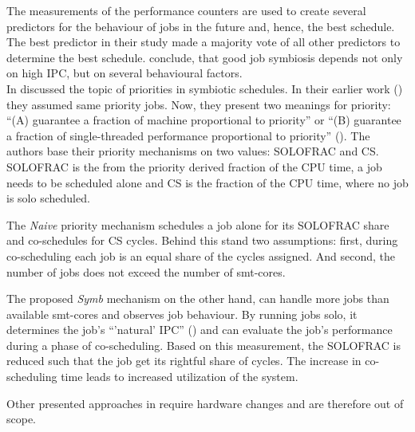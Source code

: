 The measurements of the performance counters are used to create several
predictors for the behaviour of jobs in the future and, hence, the best schedule.
The best predictor in their study made a majority vote of all other predictors
to determine the best schedule.
\citeauthor{snavely_symbiotic_2000} conclude, that good job symbiosis depends
not only on high IPC, but on several behavioural factors.
\\


In \citeyear{snavely_symbiotic_2002} \citeauthor{snavely_symbiotic_2002}
discussed the topic of priorities in symbiotic schedules.
In their earlier work (\cite{snavely_symbiotic_2000}) they assumed same
priority jobs.
Now, they present two meanings for priority: ``(A) guarantee a fraction of
machine proportional to priority'' or ``(B) guarantee a fraction of
single-threaded performance proportional to priority''
(\autocite[70]{snavely_symbiotic_2002}).
The authors base their priority mechanisms on two values: SOLOFRAC and CS.
SOLOFRAC is the from the priority derived fraction of the CPU time,
a job needs to be scheduled alone  and CS is the fraction of the CPU time,
where no job is solo scheduled.

The \textit{Naive} priority mechanism schedules a job alone for its SOLOFRAC
share and co-schedules for CS cycles. Behind this stand two assumptions: first,
during co-scheduling each job is an equal share of the cycles assigned.
And second, the number of jobs does not exceed the number of \gls{smt}-cores.

The proposed \textit{Symb} mechanism on the other hand, can handle more jobs
than available \gls{smt}-cores and observes job behaviour. By running jobs
solo, it determines the job's ``'natural' IPC''
(\autocite[71]{snavely_symbiotic_2002})
and can evaluate the job's performance during a phase of co-scheduling.
Based on this measurement, the SOLOFRAC is reduced such that the job get its
rightful share of cycles. The increase in co-scheduling time leads to increased
utilization of the system.

Other presented approaches in \cite{snavely_symbiotic_2002} require hardware
changes and are therefore out of scope.
\\


